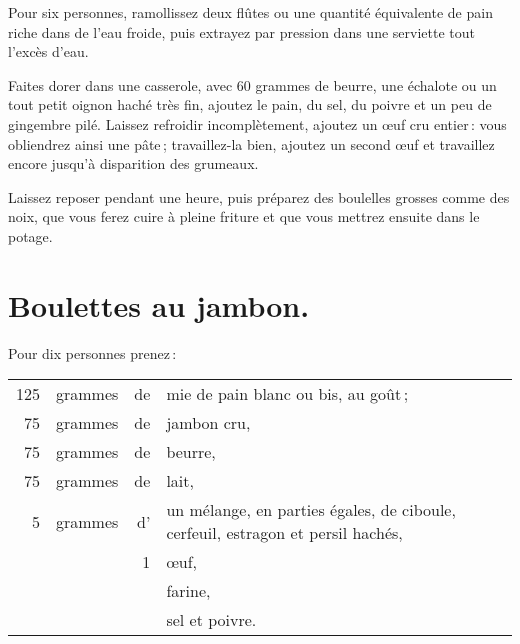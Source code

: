 \justifying\normalfont
Pour six personnes, ramollissez deux flûtes ou une quantité équivalente de pain
riche dans de l'eau froide, puis extrayez par pression dans une serviette tout
l'excès d'eau.

Faites dorer dans une casserole, avec 60 grammes de beurre, une échalote ou un
tout petit oignon haché très fin, ajoutez le pain, du sel, du poivre et un peu
de gingembre pilé. Laissez refroidir incomplètement, ajoutez un œuf cru
entier : vous obliendrez ainsi une pâte ; travaillez-la bien, ajoutez un second
œuf et travaillez encore jusqu'à disparition des grumeaux.

Laissez reposer pendant une heure, puis préparez des boulelles grosses comme
des noix, que vous ferez cuire à pleine friture et que vous mettrez ensuite
dans le potage.

\section*{\centering Boulettes au jambon.}

Pour dix personnes prenez :

\medskip

\footnotesize
\begin{longtable}{rrrp{16em}}                                                    
    125 & grammes & de & mie de pain blanc ou bis, au goût ;                                              \\
     75 & grammes & de & jambon cru,                                                                      \\
     75 & grammes & de & beurre,                                                                          \\
     75 & grammes & de & lait,                                                                            \\
      5 & grammes & d' & un mélange, en parties égales, de ciboule, cerfeuil, estragon et                  
                         persil hachés,                                                                   \\
        &         &  1 & œuf,                                                                             \\
        &         &    & farine,                                                                          \\
        &         &    & sel et poivre.                                                                   \\
\end{longtable}
\normalsize

